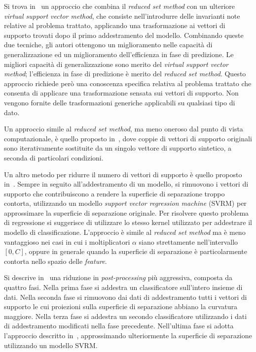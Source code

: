Si trova in~\cite{burges_improving_accuracy} un approccio che combina il \emph{reduced set method} con un ulteriore \emph{virtual support vector method}, che consiste nell'introdurre delle invarianti note relative al problema trattato, applicando una trasformazione ai vettori di supporto trovati dopo il primo addestramento del modello. 
Combinando queste due tecniche, gli autori ottengono un miglioramento nelle capacità di generalizzazione ed un miglioramento dell'efficienza in fase di predizione. Le migliori capacità di generalizzazione sono merito del \emph{virtual support vector method}; l'efficienza in fase di predizione è merito del \emph{reduced set method}.
Questo approccio richiede però una conoscenza specifica relativa al problema trattato che consenta di applicare una trasformazione sensata sui vettori di supporto. Non vengono fornite delle trasformazioni generiche applicabili su qualsiasi tipo di dato. 

Un approccio simile al \emph{reduced set method}, ma meno oneroso dal punto di vista computazionale, è quello proposto in~\cite{2005_merging_strategy}, dove coppie di vettori di supporto originali sono iterativamente sostituite da un singolo vettore di supporto sintetico, a seconda di particolari condizioni. 

Un altro metodo per ridurre il numero di vettori di supporto è quello proposto in~\cite{1998_reducing_svm_complexity}. 
Sempre in seguito all'addestramento di un modello, si rimuovono i vettori di supporto che contribuiscono a rendere la superficie di separazione troppo contorta, utilizzando un modello \emph{support vector regression machine} (SVRM) per approssimare la superficie di separazione originale.
Per risolvere questo problema di regressione si suggerisce di utilizzare lo stesso kernel utilizzato per addestrare il modello di classificazione.
L'approccio è simile al \emph{reduced set method} ma è meno vantaggioso nei casi in cui i moltiplicatori $\alpha$ siano strettamente nell'intervallo $[0,C]$, oppure in generale quando la superficie di separazione è particolarmente contorta nello spazio delle \emph{feature}.

Si descrive in~\cite{2005_multistage_postprocessing} una riduzione in \emph{post-processing} più aggressiva, composta da quattro fasi. 
Nella prima fase si addestra un classificatore sull'intero insieme di dati. 
Nella seconda fase si rimuovono dai dati di addestramento tutti i vettori di supporto le cui proiezioni sulla superficie di separazione abbiano la curvatura maggiore. 
Nella terza fase si addestra un secondo classificatore utilizzando i dati di addestramento modificati nella fase precedente. 
Nell'ultima fase si adotta l'approccio descritto in~\cite{1998_reducing_svm_complexity}, approssimando ulteriormente la superficie di separazione utilizzando un modello SVRM.

